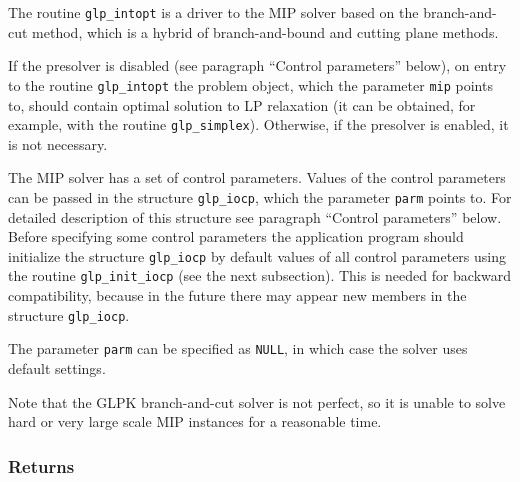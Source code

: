 The routine \verb|glp_intopt| is a driver to the MIP solver based on
the branch-and-cut method, which is a hybrid of branch-and-bound and
cutting plane methods.

If the presolver is disabled (see paragraph ``Control parameters''
below), on entry to the routine \verb|glp_intopt| the problem object,
which the parameter \verb|mip| points to, should contain optimal
solution to LP relaxation (it can be obtained, for example, with the
routine \verb|glp_simplex|). Otherwise, if the presolver is enabled, it
is not necessary.

The MIP solver has a set of control parameters. Values of the control
parameters can be passed in the structure \verb|glp_iocp|, which the
parameter \verb|parm| points to. For detailed description of this
structure see paragraph ``Control parameters'' below. Before specifying
some control parameters the application program should initialize the
structure \verb|glp_iocp| by default values of all control parameters
using the routine \verb|glp_init_iocp| (see the next subsection). This
is needed for backward compatibility, because in the future there may
appear new members in the structure \verb|glp_iocp|.

The parameter \verb|parm| can be specified as \verb|NULL|, in which case
the solver uses default settings.

Note that the GLPK branch-and-cut solver is not perfect, so it is unable
to solve hard or very large scale MIP instances for a reasonable time.

\subsubsection*{Returns}

\def\arraystretch{1}

